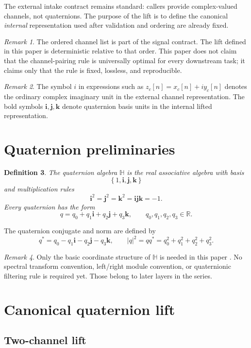 \documentclass[11pt]{article}
\newtheorem{definition}{Definition}[section]
\theoremstyle{remark}
\newtheorem{remark}[definition]{Remark}
\newcommand{\R}{\mathbb{R}}
\newcommand{\HH}{\mathbb{H}}
\newcommand{\ii}{\mathbf{i}}
\newcommand{\jj}{\mathbf{j}}
\newcommand{\kk}{\mathbf{k}}
\newcommand{\abs}[1]{\left\lvert #1 \right\rvert}
\newcommand{\set}[1]{\left\{ #1 \right\}}
\begin{document}
The external intake contract remains standard: callers provide complex-valued channels, not quaternions. The purpose of the lift is to define the canonical \emph{internal} representation used after validation and ordering are already fixed.

\begin{remark}
The ordered channel list is part of the signal contract. The lift defined in this paper is deterministic relative to that order. This paper does not claim that the channel-pairing rule is universally optimal for every downstream task; it claims only that the rule is fixed, lossless, and reproducible.
\end{remark}

\begin{remark}
The symbol \(i\) in expressions such as \(z_c[n]=x_c[n]+iy_c[n]\) denotes the ordinary complex imaginary unit in the external channel representation. The bold symbols \(\ii,\jj,\kk\) denote quaternion basis units in the internal lifted representation.
\end{remark}

\section{Quaternion preliminaries}

\begin{definition}
The quaternion algebra \(\HH\) is the real associative algebra with basis
\[
\set{1,\ii,\jj,\kk}
\]
and multiplication rules
\[
\ii^2=\jj^2=\kk^2=\ii\jj\kk=-1.
\]
Every quaternion has the form
\[
q=q_0+q_1\ii+q_2\jj+q_3\kk,
\qquad q_0,q_1,q_2,q_3\in\R.
\]
\end{definition}

The quaternion conjugate and norm are defined by
\[
q^*=q_0-q_1\ii-q_2\jj-q_3\kk,
\qquad
\abs{q}^2=qq^*=q_0^2+q_1^2+q_2^2+q_3^2.
\]

\begin{remark}
Only the basic coordinate structure of \(\HH\) is needed in this paper \citep{kuipers1999}. No spectral transform convention, left/right module convention, or quaternionic filtering rule is required yet. Those belong to later layers in the series.
\end{remark}

\section{Canonical quaternion lift}

\subsection{Two-channel lift}
\end{document}
